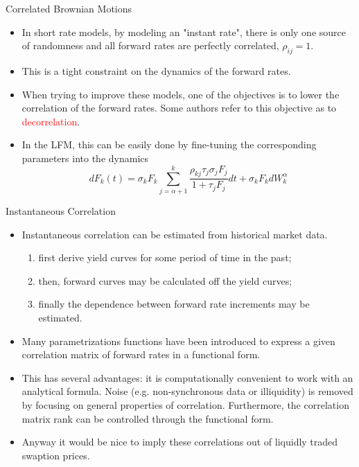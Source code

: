 \documentclass{beamer}
\begin{document}
\begin{frame}{Correlated Brownian Motions}
	\begin{itemize}
	\item In short rate models, by modeling an "instant rate", there is only one source of randomness and all forward rates are perfectly correlated, $\rho_{ij}=1$.
	\item This is a tight constraint on the dynamics of the forward rates.
	\item When trying to improve these models, one of the objectives is to lower the correlation of the forward rates. Some authors refer to this objective as to \textcolor{red}{decorrelation}. 
	\item In the LFM, this can be easily done by fine-tuning the corresponding parameters into the dynamics 
	\begin{equation*}
dF_k(t) = \sigma_kF_k\sum_{j=\alpha+1}^k\frac{\boxed{\rho_{kj}}\tau_j\sigma_jF_j}{1+\tau_jF_j}dt+\sigma_kF_k dW^\alpha_k
	\end{equation*}
\end{itemize}
\end{frame}

\begin{frame}{Instantaneous Correlation}
  \begin{itemize}    
  \item<1-> Instantaneous correlation can be estimated from historical market data.
  \begin{enumerate}
	  \item first derive yield curves for some period of time in the past;
	  \item then, forward curves may be calculated off the yield curves;
	  \item finally the dependence between forward rate increments may be estimated. 
  \end{enumerate}
  \item<2-> Many parametrizations functions have been introduced to express a given correlation matrix of forward rates in a functional form.
  \item<3-> This has several advantages: it is computationally convenient to work with an analytical formula. Noise (e.g. non-synchronous data or illiquidity) is removed by focusing on general properties of correlation. Furthermore, the correlation matrix rank can be controlled through the functional form.
  \item<4-> Anyway it would be nice to imply these correlations out of liquidly traded swaption prices. 
  \end{itemize}
\end{frame}
\end{document}
